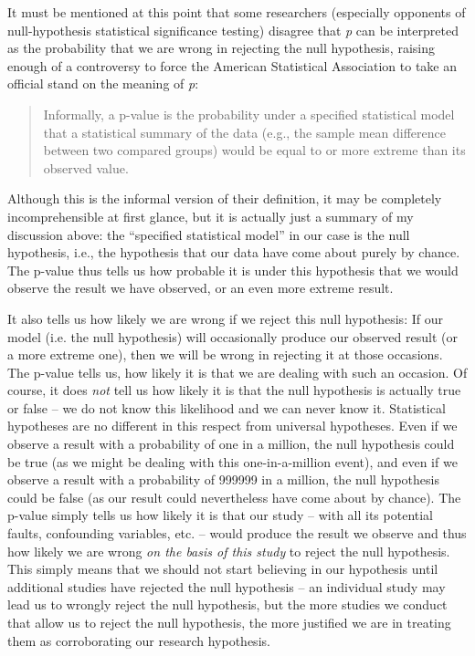 It must be mentioned at this point that some researchers (especially opponents of null-hypothesis statistical significance testing) disagree that \textit{p} can be interpreted as the probability that we are wrong in rejecting the null hypothesis, raising enough of a controversy to force the American Statistical Association to take an official stand on the meaning of \textit{p}:

\begin{quote}
Informally, a p-value is the probability under a specified statistical model that a statistical summary of the data (e.g., the sample mean difference between two compared groups) would be equal to or more extreme than its observed value. \citep[131]{wasserstein_asas_2016}
\end{quote}

Although this is the informal version of their definition, it may be completely incomprehensible at first glance, but it is actually just a summary of my discussion above: the ``specified statistical model'' in our case is the null hypothesis, i.e., the hypothesis that our data have come about purely by chance. The p-value thus tells us how probable it is under this hypothesis that we would observe the result we have observed, or an even more extreme result.

It also tells us how likely we are wrong if we reject this null hypothesis: If our model (i.e. the null hypothesis) will occasionally produce our observed result (or a more extreme one), then we will be wrong in rejecting it at those occasions. The p-value tells us, how likely it is that we are dealing with such an occasion. Of course, it does \textit{not} tell us how likely it is that the null hypothesis is actually true or false -- we do not know this likelihood and we can never know it. Statistical hypotheses are no different in this respect from universal hypotheses. Even if we observe a result with a probability of one in a million, the null hypothesis could be true (as we might be dealing with this one-in-a-million event), and even if we observe a result with a probability of \num{999999} in a million, the null hypothesis could be false (as our result could nevertheless have come about by chance). The p-value simply tells us how likely it is that our study -- with all its potential faults, confounding variables, etc. -- would produce the result we observe and thus how likely we are wrong \textit{on the basis of this study} to reject the null hypothesis. This simply means that we should not start believing in our hypothesis until additional studies have rejected the null hypothesis -- an individual study may lead us to wrongly reject the null hypothesis, but the more studies we conduct that allow us to reject the null hypothesis, the more justified we are in treating them as corroborating our research hypothesis.

